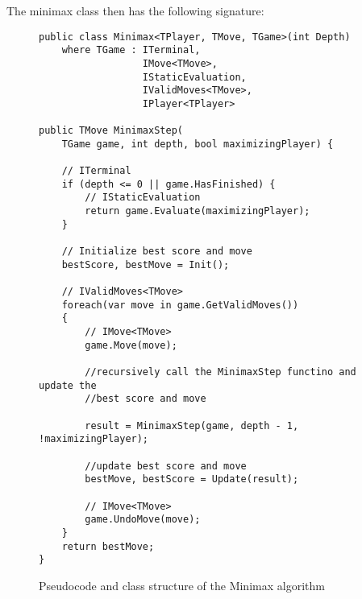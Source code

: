 The minimax class then has the following signature:

\begin{figure}[h]
\captionsetup{justification=centering}
\begin{lstlisting}
public class Minimax<TPlayer, TMove, TGame>(int Depth)
    where TGame : ITerminal,
                  IMove<TMove>,
                  IStaticEvaluation,
                  IValidMoves<TMove>,
                  IPlayer<TPlayer>

public TMove MinimaxStep(
    TGame game, int depth, bool maximizingPlayer) {
    
    // ITerminal
    if (depth <= 0 || game.HasFinished) {
        // IStaticEvaluation
        return game.Evaluate(maximizingPlayer);
    }

    // Initialize best score and move
    bestScore, bestMove = Init();

    // IValidMoves<TMove>
    foreach(var move in game.GetValidMoves())
    {
        // IMove<TMove>
        game.Move(move);

        //recursively call the MinimaxStep functino and update the
        //best score and move
        
        result = MinimaxStep(game, depth - 1, !maximizingPlayer);

        //update best score and move
        bestMove, bestScore = Update(result);
        
        // IMove<TMove>
        game.UndoMove(move);
    }
    return bestMove;
}
\end{lstlisting}
\caption{Pseudocode and class structure of the Minimax algorithm}
\label{fig:minimaxAlgo}
\end{figure}



